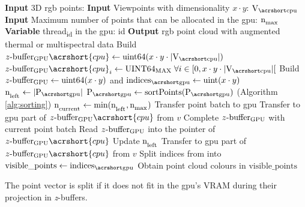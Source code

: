 \begin{algorithm}
    \small
    \begin{algorithmic}[1]
        \State \textbf{Input} 3D \acrshort{rgb} points: \Points %
    	\State \textbf{Input} Viewpoints with dimensionality $x \cdot y$: $\Viewpoints$ %
    	\State \textbf{Input} Maximum number of points that can be allocated in the \acrshort{gpu}: $\textrm{n}_\textsubscript{max}$ %
        \State \textbf{Variable} \textrm{thread}\textsubscript{id} in the \acrshort{gpu}: id %
        \State \textbf{Output} \acrshort{rgb} point cloud with augmented thermal or multispectral data %
        \State Build $\Zbuffer\acrshort{cpu} \gets \textrm{uint64}(x \cdot y \cdot |\Viewpoints|)$ %
        \State $\Zbuffer\acrshort{cpu}_{i} \gets \textrm{UINT64\textsubscript{MAX}} \Space \forall i \in \left[0, x \cdot y \cdot |\Viewpoints|\right[$ %
        \State Build $z\textrm{-buffer}\textsubscript{GPU} \gets \textrm{uint64}(x \cdot y)$ and $\Indices \gets \textrm{uint}(x \cdot y)$ %
        \State $\LeftPoints \gets \PCCardinality$ %
            \State $\Points \gets \textrm{sortPoints}(\Points)$   \Comment(Algorithm \ref{alg:sorting}) %
        \EndIf
            \State $\textrm{n}_\textsubscript{current} \gets \textrm{min}(\textrm{n}_\textsubscript{left}, \textrm{n}_\textsubscript{max})$ %
            \State Transfer point batch to \acrshort{gpu} %
                \State Transfer to \acrshort{gpu} part of $\Zbuffer\acrshort{cpu}$ from $v$ %
                \State Complete $z\textrm{-buffer}\textsubscript{GPU}$ with current point batch %
                \State Read $z\textrm{-buffer}\textsubscript{GPU}$ into the pointer of $\Zbuffer\acrshort{cpu}$ %
            \EndFor
            \State Update $\textrm{n}_\textsubscript{left}$ %
        \EndWhile
            \State Transfer to \acrshort{gpu} part of $\Zbuffer\acrshort{cpu}$ from $v$ %
            \State Split indices from \Zbuffer \hspace{1mm} into \Indices %
            \State $\textrm{visible\_points} \gets \Indices$ %
            \State Obtain point cloud colours in $\textrm{visible\_points}$ %
        \EndFor
        \caption{The point vector is split if it does not fit in the \acrshort{gpu}'s VRAM during their projection in \textit{z}-buffers.}
        \label{alg:gpu_multiple_batch}
      \end{algorithmic}
      \normalsize
\end{algorithm}

